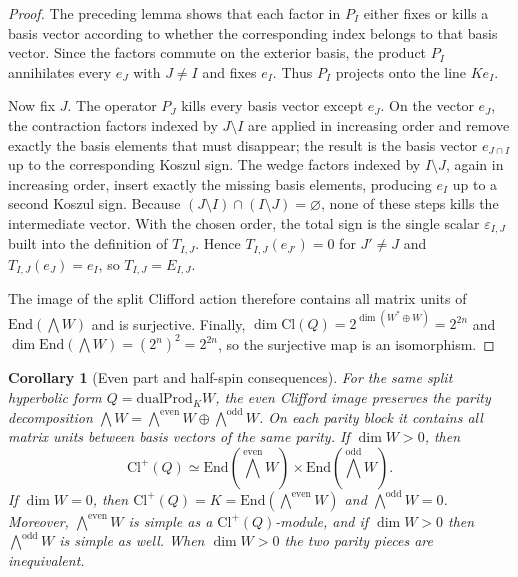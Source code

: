 \documentclass[11pt,a4paper]{article}
\theoremstyle{plain}
\newtheorem{corollary}[theorem]{Corollary}
\theoremstyle{definition}
\theoremstyle{remark}
\newcommand{\Cl}{\mathrm{Cl}}
\newcommand{\End}{\mathrm{End}}
\newcommand{\dualProd}{\mathrm{dualProd}}
\newcommand{\wedgeEven}{\bigwedge^{\mathrm{even}} W}
\newcommand{\wedgeOdd}{\bigwedge^{\mathrm{odd}} W}
\begin{document}
\begin{proof}
The preceding lemma shows that each factor in $P_I$ either fixes or kills a
basis vector according to whether the corresponding index belongs to that basis
vector. Since the factors commute on the exterior basis, the product $P_I$
annihilates every $e_J$ with $J\neq I$ and fixes $e_I$. Thus $P_I$ projects
onto the line $Ke_I$.

Now fix $J$. The operator $P_J$ kills every basis vector except $e_J$. On the
vector $e_J$, the contraction factors indexed by $J\setminus I$ are applied in
increasing order and remove exactly the basis elements that must disappear; the
result is the basis vector $e_{J\cap I}$ up to the corresponding Koszul sign.
The wedge factors indexed by $I\setminus J$, again in increasing order, insert
exactly the missing basis elements, producing $e_I$ up to a second Koszul sign.
Because $(J\setminus I)\cap(I\setminus J)=\varnothing$, none of these steps
kills the intermediate vector. With the chosen order, the total sign is the
single scalar $\varepsilon_{I,J}$ built into the definition of $T_{I,J}$.
Hence $T_{I,J}(e_{J'})=0$ for $J'\neq J$ and $T_{I,J}(e_J)=e_I$, so
$T_{I,J}=E_{I,J}$.

The image of the split Clifford action therefore contains all matrix units of
$\End(\bigwedge W)$ and is surjective. Finally,
$\dim \Cl(Q)=2^{\dim(W^*\oplus W)}=2^{2n}$ and
$\dim \End(\bigwedge W)=(2^n)^2=2^{2n}$, so the surjective map is an
isomorphism.
\end{proof}

\begin{corollary}[Even part and half-spin consequences]
\label{cor:even-half-spin}
For the same split hyperbolic form $Q=\dualProd_K W$, the even Clifford image
preserves the parity decomposition
$\bigwedge W=\wedgeEven\oplus\wedgeOdd$. On each parity block it contains all
matrix units between basis vectors of the same parity. If $\dim W>0$, then
\[
  \Cl^+(Q)\simeq \End(\wedgeEven)\times \End(\wedgeOdd).
\]
If $\dim W=0$, then $\Cl^+(Q)=K=\End(\wedgeEven)$ and $\wedgeOdd=0$. Moreover,
$\wedgeEven$ is simple as a $\Cl^+(Q)$-module, and if $\dim W>0$ then
$\wedgeOdd$ is simple as well. When $\dim W>0$ the two parity pieces are
inequivalent.
\end{corollary}
\end{document}
